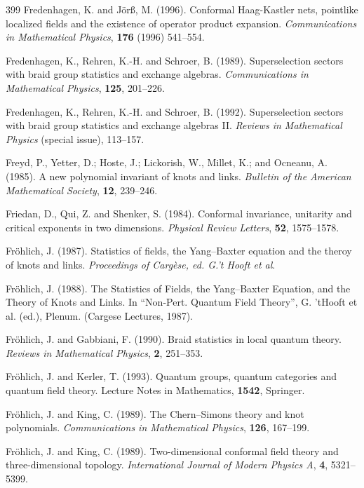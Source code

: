 \documentclass[12pt]{article}
\theoremstyle{plain}
\theoremstyle{definition}
\numberwithin{equation}{section}
\begin{document}
\begin{thebibliography} {399}
Fredenhagen, K. and J\"or\ss, M. (1996).
Conformal Haag-Kastler nets, pointlike localized fields and
the existence of operator product expansion.
{\em Communications in Mathematical Physics},
{\bf 176} (1996) 541--554.

Fredenhagen, K., Rehren, K.-H. and Schroer, B. (1989).
Superselection sectors with braid group statistics 
and exchange algebras.
{\em Communications in Mathematical Physics},
{\bf 125}, 201--226.

Fredenhagen, K., Rehren, K.-H. and Schroer, B. (1992).
Superselection sectors with braid group statistics
and exchange algebras II.  
{\em Reviews in Mathematical Physics} (special issue), 113--157.

Freyd, P., Yetter, D.; Hoste, J.; Lickorish, W., 
Millet, K.; and Ocneanu, A. (1985).
A new polynomial invariant of knots and links.
{\em Bulletin of the American Mathematical Society},
{\bf 12}, 239--246.

Friedan, D., Qui, Z. and Shenker, S. (1984).
Conformal invariance, unitarity and critical 
exponents in two dimensions.
{\em Physical Review Letters},
{\bf 52}, 1575--1578.

Fr\"ohlich, J. (1987).
Statistics of fields, the Yang--Baxter equation and 
the theroy of knots and links.
{\em Proceedings of Carg\`ese, ed. G.'t Hooft et al}.

Fr\"ohlich, J. (1988).
The Statistics of Fields, the Yang--Baxter Equation,
and the Theory of Knots and Links.
In ``Non-Pert. Quantum Field
Theory'', G. 'tHooft et al. (ed.), Plenum. 
(Cargese Lectures, 1987).

Fr\"ohlich, J. and Gabbiani, F. (1990).
Braid statistics in local quantum theory.
{\em Reviews in  Mathematical Physics}, {\bf 2},  
251--353.

Fr\"ohlich, J. and Kerler, T. (1993).
Quantum groups, quantum categories and quantum 
field theory. Lecture Notes in Mathematics, 
{\bf 1542}, Springer.

Fr\"ohlich, J. and King, C. (1989).
The Chern--Simons theory and knot polynomials.
{\em Communications in Mathematical Physics},  {\bf 126}, 167--199.

Fr\"ohlich, J. and King, C. (1989).
Two-dimensional conformal field theory and 
three-dimensional topology. 
{\em International Journal of Modern Physics A}, 
{\bf 4}, 5321--5399.


\end{thebibliography}
\end{document}
